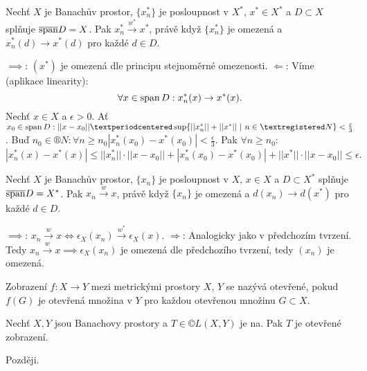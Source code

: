 \documentclass[12pt]{article}					%
\begin{document}
\begin{tvrzeni}
	Nechť $X$ je Banachův prostor, $\{x^*_n\}$ je posloupnost v $X^*$, $x^* \in X^*$ a $D \subset X$ splňuje $\overline{\operatorname{span}} D = X$. Pak $x^*_n \overset{w^*}{\rightarrow} x^*$, právě když $\{x^*_n\}$ je omezená a $x^*_n(d) \rightarrow x^*(d)$ pro každé $d \in D$.

	\begin{dukazin}
		$\implies$: $(x^*)$ je omezená dle principu stejnoměrné omezenosti. $\Leftarrow$: Víme (aplikace linearity):
		$$ \forall x \in \operatorname{span} D: x_n^*(x) \rightarrow x^*(x). $$
		Nechť $x \in X$ a $\epsilon > 0$. Ať $x_0 \in \spn D: ||x - x_0|| · \sup\{||x_n^*||+||x^*||\ |\ n \in ®N\} < \frac{\epsilon}{3}$. Buď $n_0 \in ®N: \forall n ≥ n_0 |x_n^*(x_0) - x^*(x_0)| < \frac{\epsilon}{3}$. Pak $\forall n ≥ n_0$:
		$$ |x_n^*(x) - x^*(x)| ≤ ||x_n^*||·||x - x_0|| + |x_n^*(x_0) - x^*(x_0)| + ||x^*||·||x - x_0|| ≤ \epsilon. $$
	\end{dukazin}
\end{tvrzeni}

\begin{tvrzeni}
	Nechť $X$ je Banachův prostor, $\{x_n\}$ je posloupnost v $X$, $x \in X$ a $D \subset X^*$ splňuje $\overline{\operatorname{span}} D = X^*$. Pak $x_n \overset{w}{\rightarrow} x$, právě když $\{x_n\}$ je omezená a $d(x_n) \rightarrow d(x^*)$ pro každé $d \in D$.

	\begin{dukazin}
		$\implies$: $x_n \overset{w}{\rightarrow} x \Leftrightarrow \epsilon_X(x_n) \overset{w^*}{\rightarrow} \epsilon_X(x)$. $\Rightarrow$: Analogicky jako v předchozím tvrzení. Tedy $x_n \overset{w}{\rightarrow} x \implies \epsilon_X(x_n)$ je omezená dle předchozího tvrzení, tedy $(x_n)$ je omezená.
	\end{dukazin}
\end{tvrzeni}

\begin{definice}
	Zobrazení $f: X \rightarrow Y$ mezi metrickými prostory $X$, $Y$ se nazývá otevřené, pokud $f(G)$ je otevřená množina v $Y$ pro každou otevřenou množinu $G \subset X$.
\end{definice}

\begin{veta}
	Nechť $X, Y$ jsou Banachovy prostory a $T \in ©L(X, Y)$ je na. Pak $T$ je otevřené zobrazení.

	\begin{dukazin}
		Později.
	\end{dukazin}
\end{veta}
\end{document}
